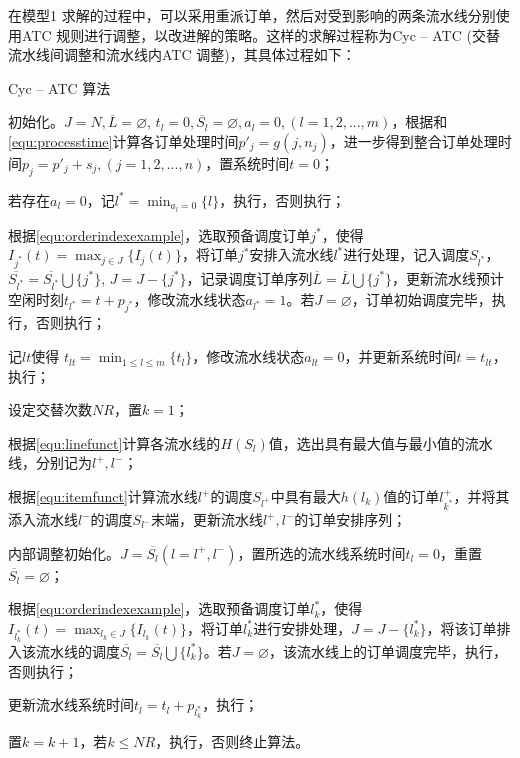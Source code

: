 在模型1 求解的过程中，可以采用重派订单，然后对受到影响的两条流水线分别使用ATC 规则进行调整，以改进解的策略。这样的求解过程称为Cyc -- ATC (交替流水线间调整和流水线内ATC 调整)，其具体过程如下：
\begin{algori}
Cyc -- ATC 算法\label{alg:cycatc}
\begin{asparaenum}
\renewcommand{\labelenumi}{\bf Step\theenumi~}
\item 初始化。$J = N, \overline{L} = \varnothing$, $t_l = 0, \overline{S_l} = \varnothing, a_l=0, (l = 1,2,...,m)$，根据和\eqref{equ:processtime}计算各订单处理时间$p'_j = g(j, n_j)$，进一步得到整合订单处理时间$p_j = p'_j + s_j, (j = 1,2,...,n)$，置系统时间$t = 0$；
\item 若存在$a_l = 0$，记$l^* = \displaystyle\min_{a_l = 0}\{l\}$，执行，否则执行；
\item 根据\eqref{equ:orderindexexample}，选取预备调度订单$j^*$，使得$I_{j^*}(t) = \displaystyle\max_{j\in J}\{I_j(t)\}$，将订单$j^*$安排入流水线$l^*$进行处理，记入调度$S_{l^*}$，$\overline{S_{l^*}}=\overline{S_{l^*}}\bigcup \{j^*\}$, $J = J -\{j^*\}$，记录调度订单序列$\overline{L} = \overline{L} \bigcup \{j^*\}$，更新流水线预计空闲时刻$t_{l^*} = t + p_{j^*}$，修改流水线状态$a_{l^*} = 1$。若$J = \varnothing$，订单初始调度完毕，执行，否则执行；
\item 记$lt$使得 $t_{lt} = \displaystyle\min_{1\le l\le m}\{t_l\}$，修改流水线状态$a_{lt} = 0$，并更新系统时间$t = t_{lt}$，执行；
\item 设定交替次数$NR$，置$k = 1$；
\item 根据\eqref{equ:linefunct}计算各流水线的$H(S_l)$值，选出具有最大值与最小值的流水线，分别记为$l^+, l^-$；
\item 根据\eqref{equ:itemfunct}计算流水线$l^+$的调度$S_{l^+}$中具有最大$h(l_k)$值的订单$l^+_{k^*}$，并将其添入流水线$l^-$的调度$S_{l^-}$末端，更新流水线$l^+, l^-$的订单安排序列；
\item 内部调整初始化。$J = \overline{S_l}(l = l^+, l^-)$，置所选的流水线系统时间$t_l = 0$，重置$\overline{S_l} = \varnothing$；
\item 根据\eqref{equ:orderindexexample}，选取预备调度订单$l_k^*$，使得$I_{l_k^*}(t) = \displaystyle\max_{l_k\in J}\{I_{l_k}(t)\}$，将订单$l_k^*$进行安排处理，$J = J -\{l_k^*\}$，将该订单排入该流水线的调度$\overline{S_l} = \overline{S_l}\bigcup \{l_k^*\} $。若$J = \varnothing$，该流水线上的订单调度完毕，执行，否则执行；
\item 更新流水线系统时间$t_l = t_l + p_{l_k^*}$，执行；
\item 置$k = k+1$，若$k\le NR$，执行，否则终止算法。
\end{asparaenum}
\end{algori}

